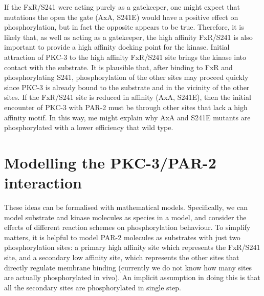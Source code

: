 \documentclass[12pt]{"report"}
\begin{document}
If the FxR/S241 were acting purely as a gatekeeper, one might expect that mutations the open the gate (AxA, S241E) would have a positive effect on phosphorylation, but in fact the opposite appears to be true. Therefore, it is likely that, as well as acting as a gatekeeper, the high affinity FxR/S241 is also important to provide a high affinity docking point for the kinase. Initial attraction of PKC-3 to the high affinity FxR/S241 site brings the kinase into contact with the substrate. It is plausible that, after binding to FxR and phosphorylating S241, phosphorylation of the other sites may proceed quickly since PKC-3 is already bound to the substrate and in the vicinity of the other sites. If the FxR/S241 site is reduced in affinity (AxA, S241E), then the initial encounter of PKC-3 with PAR-2 must be through other sites that lack a high affinity motif. In this way, me might explain why AxA and S241E mutants are phosphorylated with a lower efficiency that wild type.\\

\section*{Modelling the PKC-3/PAR-2 interaction}

These ideas can be formalised with mathematical models. Specifically, we can model substrate and kinase molecules as species in a model, and consider the effects of different reaction schemes on phosphorylation behaviour. To simplify matters, it is helpful to model PAR-2 molecules as substrates with just two phosphorylation sites: a primary high affinity site which represents the FxR/S241 site, and a secondary low affinity site, which represents the other sites that directly regulate membrane binding (currently we do not know how many sites are actually phosphorylated in vivo). An implicit assumption in doing this is that all the secondary sites are phosphorylated in single step.\\
\end{document}
